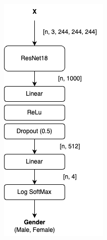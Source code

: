 \begin{figure}[htbp]
\begin{subfigure}{0.2\linewidth}
        \centering
        \includegraphics[width=\linewidth]{images/GenderModel.png}

\end{subfigure}
\end{figure}
